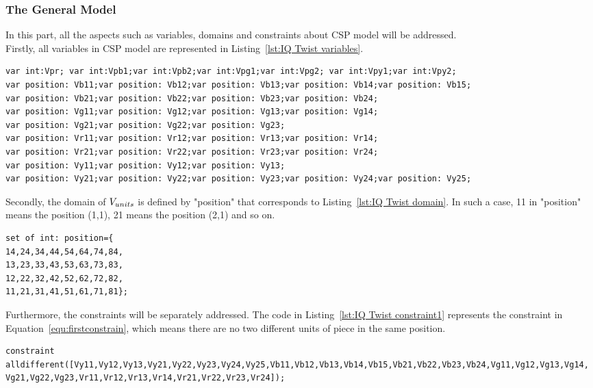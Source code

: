\subsubsection{The General Model}
In this part, all the aspects such as variables, domains and constraints about CSP model will be addressed.
\\Firstly, all variables in CSP model are represented in Listing~\ref{lst:IQ Twist variables}.
\begin{lstlisting}[caption={Encoding for variables},label={lst:IQ Twist variables},language=minizinc,numbers=none]
var int:Vpr; var int:Vpb1;var int:Vpb2;var int:Vpg1;var int:Vpg2; var int:Vpy1;var int:Vpy2;
var position: Vb11;var position: Vb12;var position: Vb13;var position: Vb14;var position: Vb15;
var position: Vb21;var position: Vb22;var position: Vb23;var position: Vb24;
var position: Vg11;var position: Vg12;var position: Vg13;var position: Vg14;
var position: Vg21;var position: Vg22;var position: Vg23;
var position: Vr11;var position: Vr12;var position: Vr13;var position: Vr14; 
var position: Vr21;var position: Vr22;var position: Vr23;var position: Vr24;
var position: Vy11;var position: Vy12;var position: Vy13;
var position: Vy21;var position: Vy22;var position: Vy23;var position: Vy24;var position: Vy25;
\end{lstlisting}
\bigskip
\smallbreak
Secondly, the domain of $V_{units}$ is defined by "position" that corresponds to Listing~\ref{lst:IQ Twist domain}. In such a case, 11 in "position" means the position (1,1), 21 means the position (2,1) and so on.
\begin{lstlisting}[language=minizinc,numbers=none,caption={Encoding for pieces' domain},label={lst:IQ Twist domain}]
set of int: position={
14,24,34,44,54,64,74,84,
13,23,33,43,53,63,73,83,
12,22,32,42,52,62,72,82,
11,21,31,41,51,61,71,81};
\end{lstlisting}
\bigskip
\smallbreak
Furthermore, the constraints will be separately addressed. The code in Listing~\ref{lst:IQ Twist constraint1} represents the constraint in Equation~\ref{equ:firstconstrain}, which means there are no two different units of piece in the same position.
\begin{lstlisting}[language=minizinc,numbers=none,caption={Encoding for constraint one},label={lst:IQ Twist constraint1}]
constraint alldifferent([Vy11,Vy12,Vy13,Vy21,Vy22,Vy23,Vy24,Vy25,Vb11,Vb12,Vb13,Vb14,Vb15,Vb21,Vb22,Vb23,Vb24,Vg11,Vg12,Vg13,Vg14,
Vg21,Vg22,Vg23,Vr11,Vr12,Vr13,Vr14,Vr21,Vr22,Vr23,Vr24]);
\end{lstlisting}
